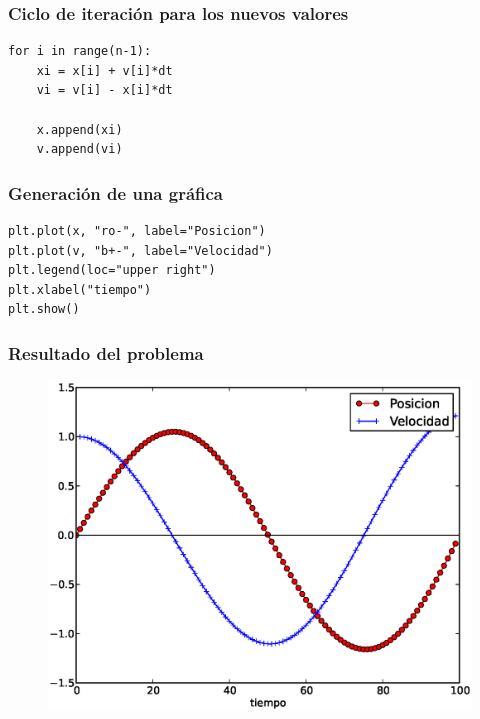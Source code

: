 \begin{frame}[fragile]
\frametitle{Ciclo de iteraci\'{o}n para los nuevos valores}
\begin{lstlisting}
for i in range(n-1):
    xi = x[i] + v[i]*dt
    vi = v[i] - x[i]*dt
    
    x.append(xi)
    v.append(vi)
\end{lstlisting}
\end{frame}
\begin{frame}[fragile]
\frametitle{Generaci\'{o}n de una gr\'{a}fica}
\begin{lstlisting}
plt.plot(x, "ro-", label="Posicion")
plt.plot(v, "b+-", label="Velocidad")
plt.legend(loc="upper right")
plt.xlabel("tiempo")
plt.show()
\end{lstlisting}
\end{frame}
\begin{frame}
\frametitle{Resultado del problema}
\begin{figure}
	\centering
	\includegraphics[scale=0.5]{Imagenes/EjerMecanica01.eps} 
\end{figure}
\end{frame}
